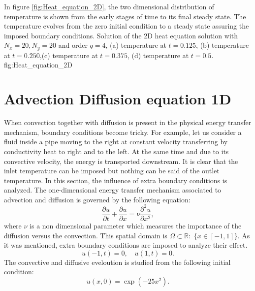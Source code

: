 In figure \ref{fig:Heat_equation_2D}, the two dimensional distribution of temperature is shown from the early stages of time to its final steady state. The temperature evolves from the zero initial condition to a steady state assuring the imposed boundary conditions. 
\fourgraphs
{}
{}
{}
{}
{Solution of the 2D heat equation solution with  $N_x=20, N_y =20$  and order $q=4$, (a) temperature at $ t=0.125$, (b) temperature at $ t=0.250$,(c) temperature at $ t=0.375$, (d) temperature at $ t=0.5$. }{fig:Heat_equation_2D}
                  
        

      
      
    
\newpage       
\section{Advection Diffusion equation 1D}
When convection together with diffusion is present in the physical energy transfer mechanism, boundary conditions become tricky. 
For example, let us consider a fluid inside a pipe moving to the right at constant velocity transferring by conductivity heat to right and to the left. At the same time and due to its convective velocity, the energy is transported downstream. It is clear that the inlet temperature can be imposed but nothing can be said of the outlet temperature.  
In this section, the influence of extra boundary conditions is analyzed. 
The one-dimensional energy transfer mechanism associated to advection and diffusion is governed by the following equation: 
       \begin{equation*}      	
       \frac{\partial u}{\partial t} +  \frac{\partial u}{\partial x} = \nu \frac{\partial^2 u}{\partial x^2},
       \end{equation*}
where $ \nu $ is a non dimensional parameter which measures the importance of the diffusion versus the convection.      
This spatial domain is $\Omega \subset \mathbb{R} : $ $\{x\in  [-1,1]\}$.   
As it was mentioned, extra boundary conditions are imposed to analyze their effect. 
       \begin{equation*}      	
       u(-1,t)=0, \quad u(1,t)=0.
       \end{equation*}
The convective and diffusive eveloution is studied from the following initial condition:
       \begin{equation*}      	
       u(x,0)=\exp(-25 x^2).
       \end{equation*}
       
